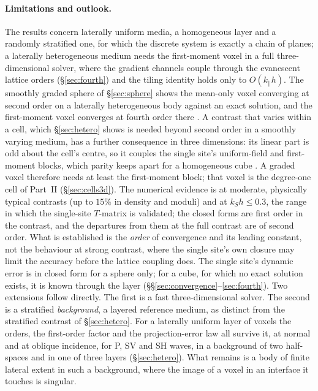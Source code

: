 \documentclass[11pt,a4paper]{article}
\begin{document}
\paragraph{Limitations and outlook.} The results concern laterally uniform media, a homogeneous layer
and a randomly stratified one, for which the discrete system is exactly a chain of planes; a laterally heterogeneous medium needs the
first-moment voxel in a full three-dimensional solver, where the gradient channels couple through
the evanescent lattice orders (\S\ref{sec:fourth}) and the tiling identity holds only to
$O(k_\parallel h)$. The smoothly graded sphere of \S\ref{sec:sphere} shows the mean-only
voxel converging at second order on a laterally heterogeneous body against an exact solution, and the
first-moment voxel converges at fourth order there \citep{NestorCoupling2026}.
A contrast that varies within a cell, which \S\ref{sec:hetero} shows is needed beyond second order in a
smoothly varying medium, has a further consequence in three dimensions: its linear part is odd about
the cell's centre, so it couples the single site's uniform-field and first-moment blocks, which parity
keeps apart for a homogeneous cube \citep{NestorLegendre2026}. A graded voxel therefore needs at least the
first-moment block; that voxel is the degree-one cell of Part~II (\S\ref{sec:cells3d}). The numerical evidence is at moderate, physically typical contrasts (up to
$15\%$ in density and moduli) and at $k_Sh\le0.3$, the range in which the single-site $T$-matrix is
validated; the closed forms are first order in the contrast, and the departures from them at the
full contrast are of second order. What is established is the \emph{order} of convergence and its
leading constant, not the behaviour at strong contrast, where the single site's own closure may
limit the accuracy before the lattice coupling does. The single site's dynamic error is in closed
form for a sphere only; for a cube, for which no exact solution exists, it is known through the layer
(\S\S\ref{sec:convergence}--\ref{sec:fourth}). Two extensions follow directly. The first is
a fast three-dimensional solver. The second is a stratified \emph{background}, a layered
reference medium, as distinct from the stratified contrast of \S\ref{sec:hetero}. For a
laterally uniform layer of voxels the orders, the first-order factor and the projection-error law all
survive it, at normal and at oblique incidence, for P, SV and SH waves, in a background of two
half-spaces and in one of three layers (\S\ref{sec:hetero}). What remains is a body
of finite lateral extent in such a background, where the image of a voxel in an interface it touches
is singular.
\end{document}
